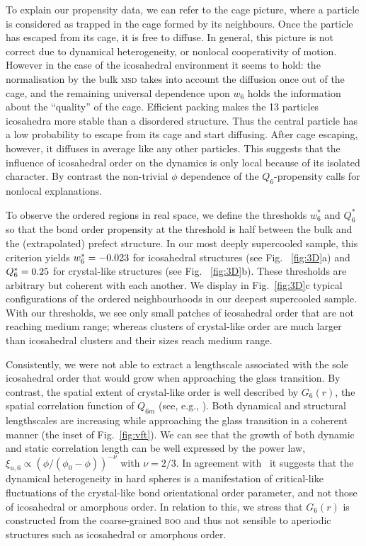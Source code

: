To explain our propensity data, we can refer to the cage picture, where a particle is considered as trapped in the cage formed by its neighbours. Once the particle has escaped from its cage, it is free to diffuse. In general, this picture is not correct due to dynamical heterogeneity, or nonlocal cooperativity of motion. However in the case of the icosahedral environment it seems to hold: the normalisation by the bulk \textsc{msd} takes into account the diffusion once out of the cage, and the remaining universal dependence upon $w_6$ holds the information about the ``quality'' of the cage. Efficient packing makes the 13 particles icosahedra more stable than a disordered structure. Thus the central particle has a low probability to escape from its cage and start diffusing. After cage escaping, however, it diffuses in average like any other particles. This suggests that the influence of icosahedral order on the dynamics is only local because of its isolated character. By contrast the non-trivial $\phi$ dependence of the $Q_6$-propensity calls for nonlocal explanations.

To observe the ordered regions in real space, we define the thresholds $w_6^*$ and $Q_6^*$ so that the bond order propensity at the threshold is half between the bulk and the (extrapolated) prefect structure. In our most deeply supercooled sample, this criterion yields $w_6^* = -0.023$ for icosahedral structures (see Fig. ~\ref{fig:3D}a) and $Q_6^* = 0.25$ for crystal-like structures (see Fig. ~\ref{fig:3D}b). These thresholds are arbitrary but coherent with each another. We display in Fig.~\ref{fig:3D}c typical configurations of the ordered neighbourhoods in our deepest supercooled sample. With our thresholds, we see only small patches of icosahedral order that are not reaching medium range; whereas clusters of crystal-like order are much larger than icosahedral clusters and their sizes reach medium range. 



Consistently, we were not able to extract a lengthscale associated with the sole icosahedral order that would grow when approaching the glass transition. By contrast, the spatial extent of crystal-like order is well described by $G_6(r)$, the spatial correlation function of $Q_{6 m}$ (see, e.g., \cite{tanaka2010critical}). Both dynamical and structural lengthscales are increasing while approaching the glass transition in a coherent manner (the inset of Fig.~\ref{fig:vft}). We can see that the growth of both dynamic and static correlation length can be well expressed by the power law,   $\xi_{u,6} \propto (\phi/(\phi_0-\phi))^{-\nu}$ with $\nu=2/3$. In agreement with~\citep{tanaka2010critical} it suggests that the dynamical heterogeneity in hard spheres is a manifestation of critical-like fluctuations of the crystal-like bond orientational order parameter, and not those of icosahedral or amorphous order. In relation to this, we stress that $G_6(r)$ is constructed from the coarse-grained \textsc{boo} and thus not sensible to aperiodic structures such as icosahedral or amorphous order. 

